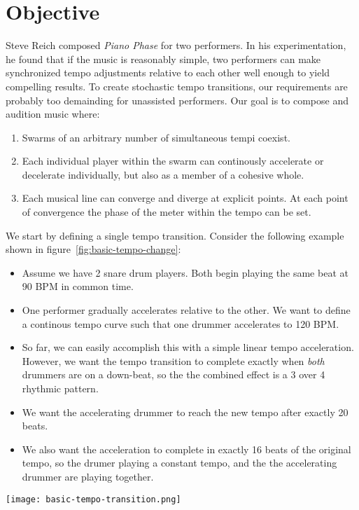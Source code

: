 \section{Objective}
\label{sec:polytempic-objective}
Steve Reich composed \textit{Piano Phase} for two performers. In his
experimentation, he found that if the music is reasonably simple, two
performers can make synchronized tempo adjustments relative to each
other well enough to yield compelling results. To create stochastic
tempo transitions, our requirements are probably too demainding for
unassisted performers. Our goal is to compose and audition music
where:
\begin{enumerate}
  \item Swarms of an arbitrary number of simultaneous tempi
    coexist. 
  \item Each individual player within the swarm can continously
    accelerate or decelerate individually, but also as a member of a
    cohesive whole. 
  \item Each musical line can converge and diverge at explicit
    points. At each point of convergence the phase of the meter within
    the tempo can be set.
\end{enumerate}
We start by defining a single tempo transition. Consider the following
example shown in figure~\ref{fig:basic-tempo-change}:
\begin{itemize}
\item Assume we have 2 snare drum players. Both begin playing the same
  beat at 90 BPM in common time.
\item One performer gradually accelerates relative to the other. We want
  to define a continous tempo curve such that one drummer accelerates
  to 120 BPM.
\item So far, we can easily accomplish this with a simple linear tempo
  acceleration. However, we want the tempo transition to complete
  exactly when \emph{both} drummers are on a down-beat, so the the
  combined effect is a 3 over 4 rhythmic pattern.
\item We want the accelerating drummer to reach the new tempo after
  exactly 20 beats.
\item We also want the acceleration to complete in exactly 16 beats of
  the original tempo, so the drumer playing a constant tempo, and the
  the accelerating drummer are playing together.
\end{itemize}
\begin{figure*}[h]
  \texttt{[image: basic-tempo-transition.png]}
  \caption[Tempo Transition]{Tempo Transition from 90~BPM
    to 120~BPM}
  \label{fig:basic-tempo-change}
\end{figure*}

